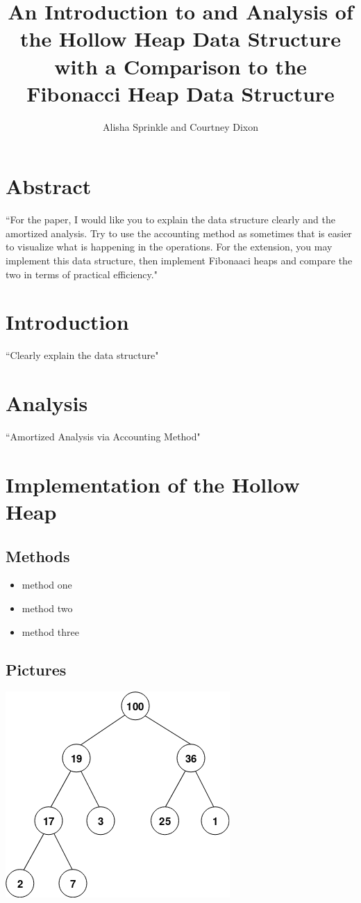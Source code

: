 \documentclass[letter,10pt]{article}
\begin{document}
\title{An Introduction to and Analysis of the Hollow Heap Data Structure with a Comparison to the Fibonacci Heap Data Structure}
\author{Alisha Sprinkle and Courtney Dixon}
\date{}
\maketitle

\section{Abstract}
``For the paper, I would like you to explain the data structure clearly and the amortized analysis. Try to use the accounting method as sometimes that is easier to visualize what is happening in the operations. For the extension, you may implement this data structure, then implement Fibonaaci heaps and compare the two in terms of practical efficiency."

\section{Introduction}
``Clearly explain the data structure"

\section{Analysis}
``Amortized Analysis via Accounting Method"

\section{Implementation of the Hollow Heap}
\subsection{Methods}
\begin{itemize}
    \item method one
    \item method two
    \item method three
\end{itemize}
\subsection{Pictures}
\begin{center}
\includegraphics{Max-Heap.png}
\end{center}


\newpage
\end{document}

